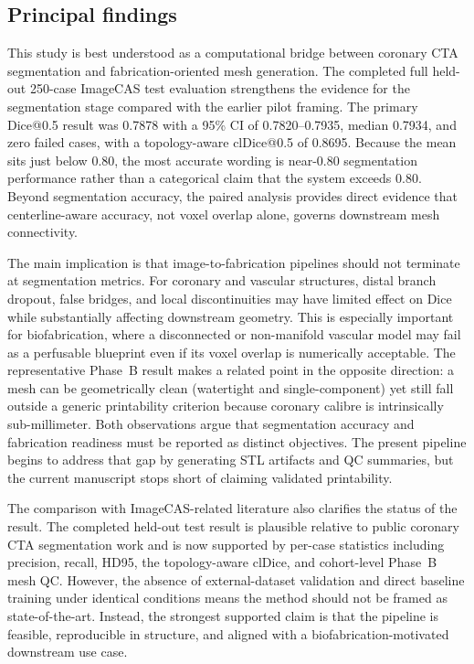 \documentclass[anonymous]{iopjournal}
\begin{document}
\subsection{Principal findings}

This study is best understood as a computational bridge between coronary CTA segmentation and fabrication-oriented mesh generation. The completed full held-out 250-case ImageCAS test evaluation strengthens the evidence for the segmentation stage compared with the earlier pilot framing. The primary Dice@0.5 result was 0.7878 with a 95\% CI of 0.7820--0.7935, median 0.7934, and zero failed cases, with a topology-aware clDice@0.5 of 0.8695. Because the mean sits just below 0.80, the most accurate wording is near-0.80 segmentation performance rather than a categorical claim that the system exceeds 0.80. Beyond segmentation accuracy, the paired analysis provides direct evidence that centerline-aware accuracy, not voxel overlap alone, governs downstream mesh connectivity.

The main implication is that image-to-fabrication pipelines should not terminate at segmentation metrics. For coronary and vascular structures, distal branch dropout, false bridges, and local discontinuities may have limited effect on Dice while substantially affecting downstream geometry. This is especially important for biofabrication, where a disconnected or non-manifold vascular model may fail as a perfusable blueprint even if its voxel overlap is numerically acceptable. The representative Phase~B result makes a related point in the opposite direction: a mesh can be geometrically clean (watertight and single-component) yet still fall outside a generic printability criterion because coronary calibre is intrinsically sub-millimeter. Both observations argue that segmentation accuracy and fabrication readiness must be reported as distinct objectives. The present pipeline begins to address that gap by generating STL artifacts and QC summaries, but the current manuscript stops short of claiming validated printability.

The comparison with ImageCAS-related literature also clarifies the status of the result. The completed held-out test result is plausible relative to public coronary CTA segmentation work and is now supported by per-case statistics including precision, recall, HD95, the topology-aware clDice, and cohort-level Phase~B mesh QC. However, the absence of external-dataset validation and direct baseline training under identical conditions means the method should not be framed as state-of-the-art. Instead, the strongest supported claim is that the pipeline is feasible, reproducible in structure, and aligned with a biofabrication-motivated downstream use case.
\end{document}
